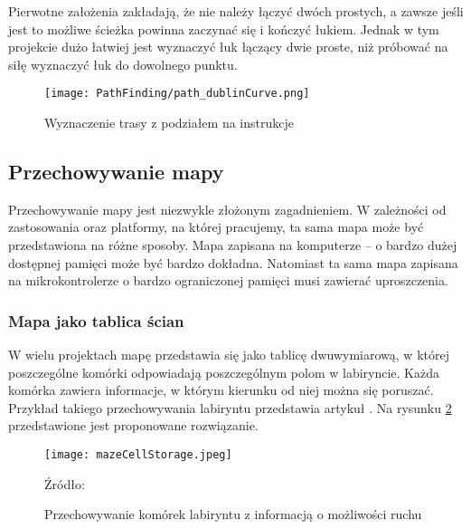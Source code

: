             Pierwotne założenia zakładają, że nie należy łączyć dwóch prostych, a zawsze jeśli jest to możliwe ścieżka powinna zaczynać się i kończyć łukiem.
            Jednak w tym projekcie dużo łatwiej jest wyznaczyć łuk łączący dwie proste, niż próbować na siłę wyznaczyć łuk do dowolnego punktu.

            \begin{figure}[!ht]
                \centering
                \texttt{[image: PathFinding/path\_dublinCurve.png]}
                \caption{Wyznaczenie trasy z podziałem na instrukcje}
                \label{fig:path_dublin}
            \end{figure}



    \subsection{Przechowywanie mapy}
    \label{subsec:przechowywanie_mapy}
        Przechowywanie mapy jest niezwykle złożonym zagadnieniem.
        W zależności od zastosowania oraz platformy, na której pracujemy, ta sama mapa może być przedstawiona na różne sposoby.
        Mapa zapisana na komputerze -- o bardzo dużej dostępnej pamięci może być bardzo dokładna.
        Natomiast ta sama mapa zapisana na mikrokontrolerze o bardzo ograniczonej pamięci musi zawierać uproszczenia.

        \subsubsection{Mapa jako tablica ścian}
            W wielu projektach mapę przedstawia się jako tablicę dwuwymiarową, w której poszczególne komórki odpowiadają poszczególnym polom w labiryncie.
            Każda komórka zawiera informacje, w którym kierunku od niej można się poruszać.
            Przykład takiego przechowywania labiryntu przedstawia artykuł \cite{maze_storage}.
            Na rysunku \ref{fig:mazeCellStorage} przedstawione jest proponowane rozwiązanie.

            \begin{figure}[!ht]
                \centering
                \texttt{[image: mazeCellStorage.jpeg]}
                \caption{Przechowywanie komórek labiryntu z informacją o możliwości ruchu}
                Źródło: \cite{maze_storage}
                \label{fig:mazeCellStorage}
            \end{figure}

